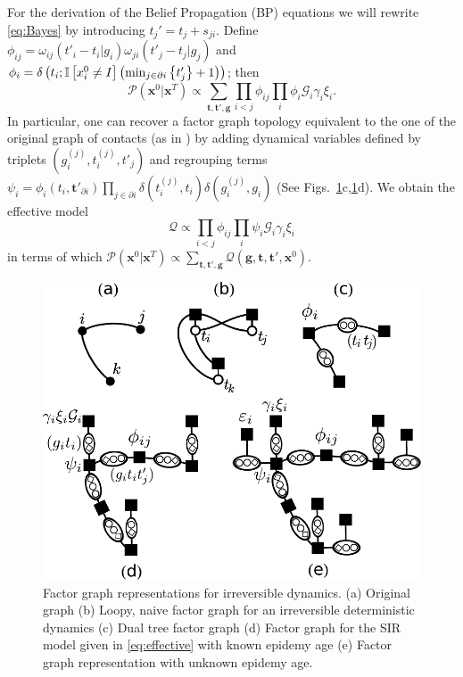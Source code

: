For the derivation of the Belief Propagation (BP) equations we will rewrite \eqref{eq:Bayes} by introducing $t_{j}'=t_{j}+s_{ji}$.
Define $\phi_{ij}=\omega_{ij}\left(t'_{i}-t_{i}|g_{i}\right)\omega_{ji}\left(t'_{j}-t_{j}|g_{j}\right)$
and $\phi_{i}=\delta\left(t_{i};\mathbb I\left[x_{i}^{0}\neq I\right]\left(\min_{j\in\partial i}\left\{ t'_{j}\right\} +1\right)\right)$;
then
\[\mathcal{P}\left(\mathbf{x}^{0}|\mathbf{x}^{T}\right)\propto\sum_{\mathbf{t},\mathbf{t}',\mathbf{g}}\prod_{i<j}\phi_{ij}\prod_{i}\phi_{i}\mathcal{G}_{i}\gamma_{i}\xi_{i}.\]
In particular, one can recover a factor graph topology equivalent to the one of the original
graph of contacts (as in \cite{altarelli_optimizing_2012,*altarelli_large_2013})
by adding dynamical variables defined by triplets $(g_{i}^{(j)},t_{i}^{(j)},t'_{j})$
and regrouping terms $\psi_{i}=\phi_{i}(t_{i},\mathbf{t}'_{\partial i})\prod_{j\in\partial i}\delta(t_{i}^{(j)},t_{i})\delta(g_{i}^{(j)},g_{i})$ (See Figs.~\ref{fig:fg}c,\ref{fig:fg}d).
We obtain the effective model
\begin{equation}
\mathcal{Q}\propto\prod_{i<j}\phi_{ij}\prod_{i}\psi_{i}\mathcal{G}_{i}\gamma_{i}\xi_{i}
\label{eq:effective}
\end{equation}
in terms of which $\mathcal{P}\left(\mathbf{x}^{0}|\mathbf{x}^{T}\right)\propto\sum_{\mathbf{t},\mathbf{t}',\mathbf{g}}\mathcal{Q}\left(\mathbf{g},\mathbf{t},\mathbf{t}',\mathbf{x}^{0}\right)$.
\begin{figure}
\includegraphics[width=1.0\columnwidth]{zero_patient/fgsir}
\caption{Factor graph representations for irreversible dynamics\label{fig:fg}. (a) Original graph (b) Loopy, naive factor graph for an irreversible deterministic dynamics (c) Dual tree factor graph (d) Factor graph for the SIR model given in \eqref{eq:effective} with known epidemy age (e) Factor graph representation with unknown epidemy age.}
\end{figure}

